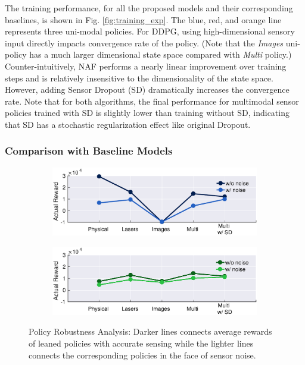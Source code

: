 \documentclass[../thesis.tex]{subfiles}
\begin{document}
The training performance, for all the proposed models and their corresponding baselines, is shown in Fig. \ref{fig:training_exp}. The blue, red, and orange line represents three uni-modal policies.
For DDPG, using high-dimensional sensory input directly impacts convergence rate of the policy. (Note that the \textit{Images} uni-policy has a much larger dimensional state space compared with \textit{Multi} policy.)
Counter-intuitively, NAF performs a nearly linear improvement over training steps and is relatively insensitive to the dimensionality of the state space. However, adding Sensor Dropout (SD) dramatically increases the convergence rate.
Note that for both algorithms, the final performance for multimodal sensor policies trained with SD is slightly lower than training without SD, indicating that SD has a stochastic regularization effect like original Dropout.
 
 
\subsubsection{Comparison with Baseline Models}
 
\begin{figure}[t]
    \centering
    \begin{subfigure}[b]{0.48\linewidth}
        \includegraphics[width=\columnwidth,trim= 40 180 45 10, clip=true]{./MultimodalDRL/fig/actual_robust_naf}
        \label{fig:actual_robust_naf}
    \end{subfigure}
    \begin{subfigure}[b]{0.48\linewidth}
        \includegraphics[width=\columnwidth,trim= 40 180 45 10, clip=true]{./MultimodalDRL/fig/actual_robust_ddpg}
        \label{fig:actual_robust_ddpg}
    \end{subfigure}
    \caption{Policy Robustness Analysis: Darker lines connects average rewards of leaned policies with accurate sensing while the lighter lines connects the corresponding policies in the face of sensor noise.}
    \label{fig:actual_robust}
\end{figure}
 
\end{document}
